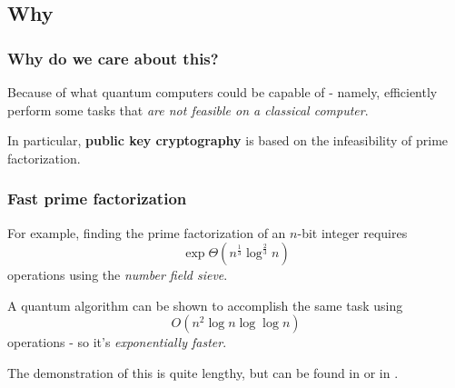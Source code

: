 \documentclass{beamer}
\begin{document}
  \subsection{Why}
  \begin{frame}
    \frametitle{Why do we care about this?}
    Because of what quantum computers could be capable of - namely, efficiently perform
    some tasks that \textit{are not feasible on a classical computer}.

    In particular, \textbf{public key cryptography} is based on the infeasibility of
    prime factorization.
  \end{frame}
  \begin{frame}
    \frametitle{Fast prime factorization}
    For example, finding the prime factorization of an $n$-bit integer requires
    \begin{equation*}
      \exp{\Theta\left(n^{\frac13}\log^{\frac23}n\right)}
    \end{equation*}
    operations using the \textit{number field sieve}.

    A quantum algorithm can be shown to accomplish the same task using
    \begin{equation*}
      O\left(n^2\log n \log\log n\right)
    \end{equation*}
    operations - so it's \textit{exponentially faster}.

    The demonstration of this is quite lengthy, but can be found in
    \cite{nielsen-chuang} or in \cite{de-wolf}.
  \end{frame}
\end{document}
